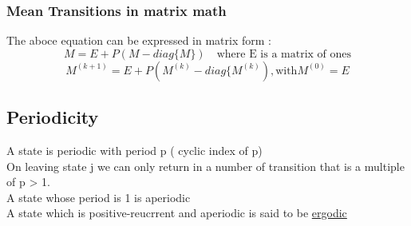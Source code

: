 \documentclass{article}
\begin{document}
	\subsubsection{Mean Transitions in matrix math}
	The aboce equation can be expressed in matrix form :
	\[ M = E + P(M - diag\{M\}) \quad\mbox{where E is a matrix of ones}\]
	\[ M^{(k+1)} = E + P(M^{(k)} - diag\{M^{(k)}), \mbox{with} M^{(0)} = E	\]
	\subsection{Periodicity} 
	A state is periodic with period p ( cyclic index of p)
	\\On leaving state j we can only return in a number of transition that is a multiple of p > 1. 
	\\A state whose period is 1 is aperiodic
	\\A state which is positive-reucrrent and aperiodic is said to be \underline{ergodic}	 
	
	
\end{document}
